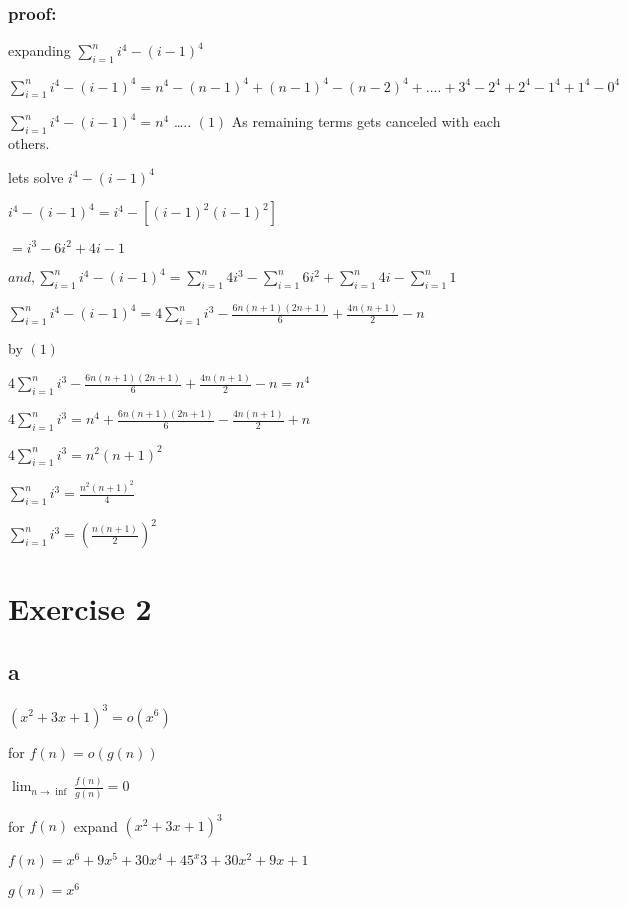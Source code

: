 \documentclass[
]{article}
\begin{document}
\hypertarget{proof-1}{%
\subsubsection{proof:}\label{proof-1}}

expanding \(\sum_{i=1}^n i^4 - (i-1)^4\)

\(\sum_{i=1}^n i^4 - (i-1)^4 = n^4 - (n-1)^4 + (n-1)^4 - (n-2)^4 + ....+3^4-2^4+2^4-1^4+1^4-0^4\)

\(\sum_{i=1}^n i^4 - (i-1)^4 = n^4\) \ldots.. \((1)\) As remaining terms
gets canceled with each others.

lets solve \(i^4 - (i-1)^4\)

\(i^4 - (i-1)^4 = i^4 - [(i-1)^2(i-1)^2]\)

\(= i^3 - 6i^2 + 4i - 1\)

\(and, \sum_{i=1}^n i^4 - (i-1)^4 = \sum_{i=1}^n 4i^3 - \sum_{i=1}^n 6i^2+ \sum_{i=1}^n 4i -\sum_{i=1}^n 1\)

\(\sum_{i=1}^n i^4 - (i-1)^4 = 4\sum_{i=1}^n i^3 - \frac{6 n (n+1) (2n+1)}{6} + \frac{4 n (n+1)}{2} - n\)

by \((1)\)

\(4\sum_{i=1}^n i^3 - \frac{6 n (n+1) (2n+1)}{6} + \frac{4 n (n+1)}{2} - n = n^4\)

\(4\sum_{i=1}^n i^3 = n^4 + \frac{6 n (n+1) (2n+1)}{6} - \frac{4 n (n+1)}{2} + n\)

\(4\sum_{i=1}^n i^3 = n^2(n+1)^2\)

\(\sum_{i=1}^n i^3 = \frac{n^2(n+1)^2}{4}\)

\(\sum_{i=1}^n i^3 = (\frac{n(n+1)}{2})^2\)

\hypertarget{exercise-2}{%
\section{Exercise 2}\label{exercise-2}}

\hypertarget{a-1}{%
\subsection{a}\label{a-1}}

\((x^2+ 3x+ 1)^3 = o(x^6)\)

for \(f(n) = o(g(n))\)

\(\lim_{n \to \inf} \frac{f(n)}{g(n)} = 0\)

for \(f(n)\) expand \((x^2+ 3x+ 1)^3\)

\(f(n) = x^6+9x^5+30x^4+45^x3+30x^2+9x+1\)

\(g(n) = x^6\)
\end{document}
